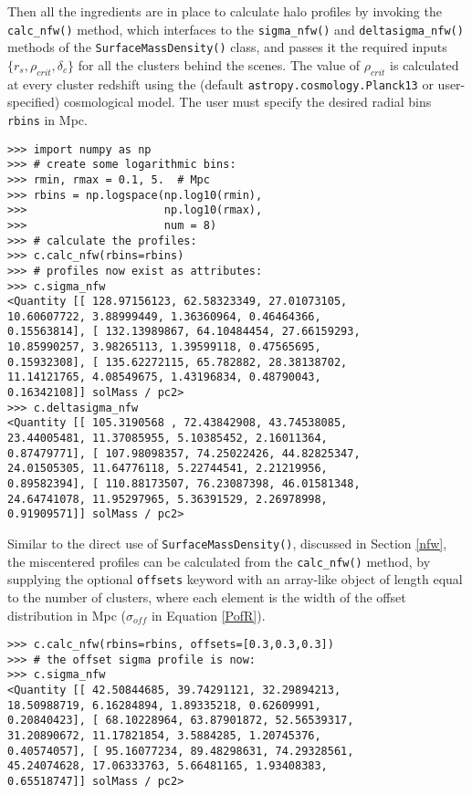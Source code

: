 \documentclass[twocolumn]{aastex6}
\newcommand{\code}{\lstinline[style=codeintext]}
\begin{document}
Then all the ingredients are in place to calculate halo profiles by invoking the \code{calc_nfw()} method, which interfaces to the \code{sigma_nfw()} and \code{deltasigma_nfw()} methods of the \code{SurfaceMassDensity()} class, and passes it the required inputs $\{ r_s, \rho_{crit}, \delta_c \}$ for all the clusters behind the scenes. The value of $\rho_{crit}$ is calculated at every cluster redshift using the (default \code{astropy.cosmology.Planck13} or user-specified) cosmological model. The user must specify the desired radial bins \code{rbins} in Mpc.
\begin{verbatim}
>>> import numpy as np
>>> # create some logarithmic bins:
>>> rmin, rmax = 0.1, 5.  # Mpc
>>> rbins = np.logspace(np.log10(rmin),
>>>                     np.log10(rmax),
>>>                     num = 8)
>>> # calculate the profiles:
>>> c.calc_nfw(rbins=rbins)
>>> # profiles now exist as attributes:
>>> c.sigma_nfw
<Quantity [[ 128.97156123, 62.58323349, 27.01073105, 
10.60607722, 3.88999449, 1.36360964, 0.46464366, 
0.15563814], [ 132.13989867, 64.10484454, 27.66159293,
10.85990257, 3.98265113, 1.39599118, 0.47565695, 
0.15932308], [ 135.62272115, 65.782882, 28.38138702, 
11.14121765, 4.08549675, 1.43196834, 0.48790043, 
0.16342108]] solMass / pc2>
>>> c.deltasigma_nfw
<Quantity [[ 105.3190568 , 72.43842908, 43.74538085, 
23.44005481, 11.37085955, 5.10385452, 2.16011364, 
0.87479771], [ 107.98098357, 74.25022426, 44.82825347,
24.01505305, 11.64776118, 5.22744541, 2.21219956, 
0.89582394], [ 110.88173507, 76.23087398, 46.01581348, 
24.64741078, 11.95297965, 5.36391529, 2.26978998,
0.91909571]] solMass / pc2>
\end{verbatim}

Similar to the direct use of \code{SurfaceMassDensity()}, discussed in Section \ref{nfw}, the miscentered profiles can be calculated from the \code{calc_nfw()} method, by supplying the optional \code{offsets} keyword with an array-like object of length equal to the number of clusters, where each element is the width of the offset distribution in Mpc ($\sigma_{off}$ in Equation \ref{PofR}).
\begin{verbatim}
>>> c.calc_nfw(rbins=rbins, offsets=[0.3,0.3,0.3])
>>> # the offset sigma profile is now:
>>> c.sigma_nfw
<Quantity [[ 42.50844685, 39.74291121, 32.29894213, 
18.50988719, 6.16284894, 1.89335218, 0.62609991, 
0.20840423], [ 68.10228964, 63.87901872, 52.56539317,
31.20890672, 11.17821854, 3.5884285, 1.20745376, 
0.40574057], [ 95.16077234, 89.48298631, 74.29328561, 
45.24074628, 17.06333763, 5.66481165, 1.93408383,
0.65518747]] solMass / pc2>
\end{verbatim}
\end{document}

